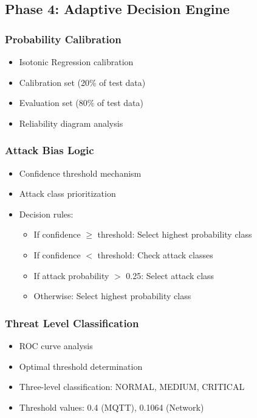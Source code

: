 \documentclass[conference]{IEEEtran}
\begin{document}
\subsection{Phase 4: Adaptive Decision Engine}

\subsubsection{Probability Calibration}
\begin{itemize}
    \item Isotonic Regression calibration
    \item Calibration set (20\% of test data)
    \item Evaluation set (80\% of test data)
    \item Reliability diagram analysis
\end{itemize}

\subsubsection{Attack Bias Logic}
\begin{itemize}
    \item Confidence threshold mechanism
    \item Attack class prioritization
    \item Decision rules:
        \begin{itemize}
            \item If confidence $\geq$ threshold: Select highest probability class
            \item If confidence $<$ threshold: Check attack classes
            \item If attack probability $>$ 0.25: Select attack class
            \item Otherwise: Select highest probability class
        \end{itemize}
\end{itemize}

\subsubsection{Threat Level Classification}
\begin{itemize}
    \item ROC curve analysis
    \item Optimal threshold determination
    \item Three-level classification: NORMAL, MEDIUM, CRITICAL
    \item Threshold values: 0.4 (MQTT), 0.1064 (Network)
\end{itemize}
\end{document}
